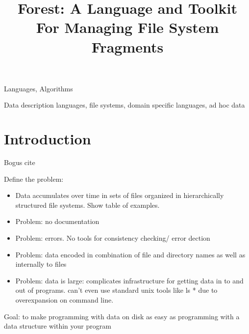 \documentclass[natbib]{sigplanconf}
\begin{document}
\copyrightdata{} 

\title{Forest:  A Language and Toolkit For Managing File System Fragments}

       {}
       {}
       {}


\maketitle{}

\begin{abstract}  

\end{abstract}


\terms
Languages, Algorithms

\keywords
Data description languages, file systems, domain specific languages, ad hoc data


\section {Introduction}
\label{sec:intro}

Bogus cite~\cite{fisher+:pads}

Define the problem:

\begin{itemize}
\item Data accumulates over time in sets of files organized in
hierarchically structured file systems.  Show table of examples.
\item Problem: no documentation
\item Problem: errors. No tools for consistency checking/ error dection
\item Problem: data encoded in combination of file and directory names as
well as internally to files
\item Problem: data is large: complicates infrastructure for
getting data in to and out of programs.  can't even use standard unix tools like ls * due to overexpansion
on command line.
\end{itemize}

Goal: to make programming with data on disk as easy as programming with a
data structure within your program
\end{document}
